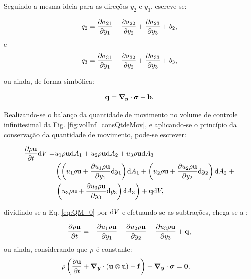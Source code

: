 \documentclass[tese_patricia]{subfiles}%
\begin{document}
Seguindo a mesma ideia para as direções $y_2$ e $y_3$, escreve-se:

\begin{align}
	q_2 =\frac{\partial \sigma_{21}}{\partial y_1} + \frac{\partial \sigma_{22}}{\partial y_2} + \frac{\partial \sigma_{23}}{\partial y_3} + b_{2},
\end{align}	
e
\begin{align}
	q_3 =\frac{\partial \sigma_{31}}{\partial y_1} + \frac{\partial \sigma_{32}}{\partial y_2} + \frac{\partial \sigma_{33}}{\partial y_3} + b_{3},
\end{align}

\noindent ou ainda, de forma simbólica:

\begin{align}
	\mathbf{q} = \boldsymbol{\nabla_y} \cdot \boldsymbol{\sigma} + \mathbf{b}.
\end{align}


Realizando-se o balanço da quantidade de movimento no volume de controle infinitesimal da Fig. \ref{fig:volInf_consQtdeMov}, e aplicando-se o princípio da conservação da quantidade de movimento, pode-se escrever:


\begin{align}
	\begin{split}
	\frac{\partial \rho \mathbf{u}}{\partial t}\mathrm{d} V =& u_1\rho \mathbf{u} \mathrm{d} A_1 + u_2\rho \mathbf{u} \mathrm{d} A_2 + u_3 \rho \mathbf{u} \mathrm{d} A_3 - \\
	 & \left(\left(u_1 \rho \mathbf{u} + \frac{\partial u_1 \rho \mathbf{u}}{\partial y_1}\mathrm{d} y_1 \right)\mathrm{d} A_1 + \left(u_2 \rho \mathbf{u} + \frac{\partial u_2 \rho \mathbf{u}}{\partial y_2}\mathrm{d} y_2 \right)\mathrm{d} A_2 \right. + \\ & \left.   \left(u_3 \rho \mathbf{u} + \frac{\partial u_3 \rho \mathbf{u}}{\partial y_3}\mathrm{d} y_3 \right)\mathrm{d} A_3\right) + \mathbf{q} \mathrm{d} V,
	\label{eq:QM_0} 
	\end{split}
\end{align}	

\noindent dividindo-se a Eq. \ref{eq:QM_0} por $\mathrm{d} V$ e efetuando-se as subtrações, chega-se a :

\begin{align}
		\frac{\partial \rho \mathbf{u}}{\partial t} = 
		-\frac{\partial u_1 \rho \mathbf{u}}{\partial y_1} 
		-\frac{\partial u_2 \rho \mathbf{u}}{\partial y_2}  
		-\frac{\partial u_3 \rho \mathbf{u}}{\partial y_3} + \mathbf{q},
		\label{eq:QM_1} 
\end{align}
\noindent ou ainda, considerando que $\rho$ é constante:
\begin{align}
	\rho\left(\frac{\partial\mathbf{u}}{\partial t} + \boldsymbol{\nabla_y} \cdot \left(\mathbf{u}\otimes\mathbf{u}\right) - \mathbf{f} \right) - \boldsymbol{\nabla_y} \cdot \boldsymbol{\sigma}  &= \mathbf{0}, \label{eq:QM_2} 
\end{align}
\end{document}
